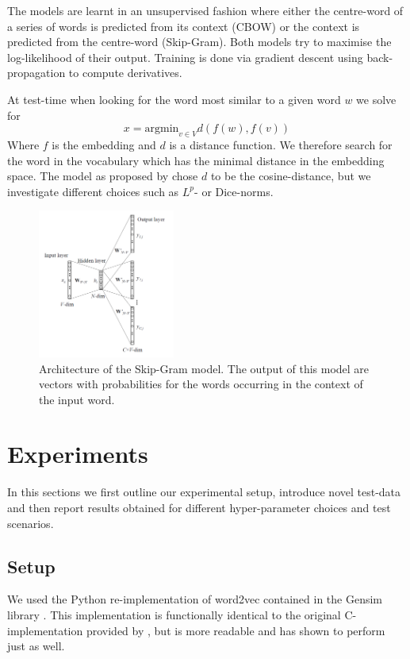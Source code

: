 \documentclass[conference]{IEEEtran}
\begin{document}
The models are learnt in an unsupervised fashion where either the centre-word of
a series of words is predicted from its context (CBOW) or the context is
predicted from the centre-word (Skip-Gram). Both models try to maximise the
log-likelihood of their output. Training is done via gradient descent using back-propagation
\cite{rumelhart1988learning} to compute derivatives.

At test-time when looking for the word most similar to a given word $w$ we solve for 
\begin{equation}
	x = \text{argmin}_{v \in V} d(f(w),f(v))
\end{equation}
Where $f$ is the embedding and $d$ is a distance function. We therefore search for the 
word in the vocabulary which has the minimal distance in the embedding space. The 
model as proposed by \cite{mikolov2013efficient} chose $d$ to be the cosine-distance, 
but we investigate different choices such as $L^p$- or Dice-norms.

\begin{figure}[t]
\centering
\includegraphics[width=0.4\textwidth]{skip-gram}
\caption{Architecture of the Skip-Gram model. The output of this model are vectors with probabilities 
for the words occurring in the context of the input word.}
\label{fig:skip}
\end{figure}


\section{Experiments}
\label{sec:exp}

In this sections we first outline our experimental setup, introduce novel test-data
 and then report results obtained for different hyper-parameter choices and test scenarios. 

\subsection{Setup}
We used the Python re-implementation of word2vec contained in the Gensim library 
\cite{rehurek_lrec}. This implementation is functionally identical to the original 
C-implementation provided by \cite{mikolov2013efficient}, but is more readable and has 
shown to perform just as well. 
\end{document}
